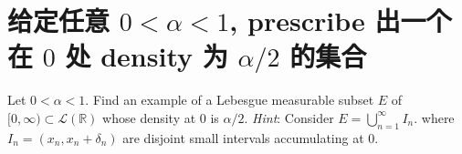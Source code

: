 \section{\texorpdfstring{给定任意 \(0 < \alpha < 1\), prescribe 出一个在 \(0\) 处 density 为 \(\alpha/2\) 的集合}{给定任意 0 \textless{} \textbackslash alpha \textless{} 1, prescribe 出一个在 0 处 density 为 \textbackslash alpha/2 的集合}}\label{ux7ed9ux5b9aux4efbux610f-0alpha-1-prescribe-ux51faux4e00ux4e2aux5728-0-ux5904-density-ux4e3a-alpha2-ux7684ux96c6ux5408}

Let \(0 < \alpha < 1\). Find an example of a Lebesgue measurable subset \(E\) of \(\lbrack 0,\infty) \subset \mathcal{L}(\mathbb{R})\) whose density at \(0\) is \(\alpha/2\). \emph{Hint}: Consider \(E = \bigcup_{n = 1}^{\infty}I_{n}\). where \(I_{n} = (x_{n},x_{n} + \delta_{n})\) are disjoint small intervals accumulating at \(0\).

